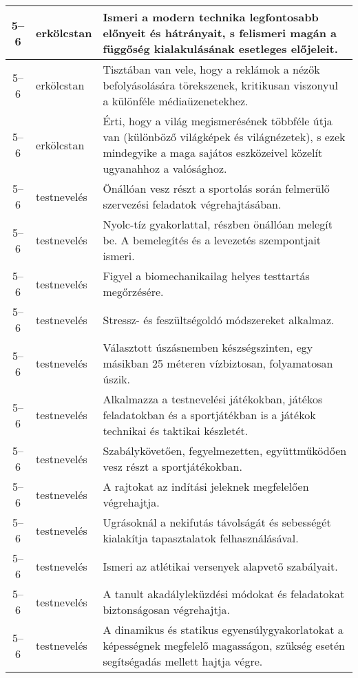 \begin{small}
\begin{longtable}{c | p{2cm} |  p{11cm} }
              5--6 & erkölcstan & Ismeri a modern technika legfontosabb előnyeit és hátrányait, s felismeri magán a függőség kialakulásának esetleges előjeleit. \\ \hline
              5--6 & erkölcstan & Tisztában van vele, hogy a reklámok a nézők befolyásolására törekszenek, kritikusan viszonyul a különféle médiaüzenetekhez. \\ \hline
              5--6 & erkölcstan & Érti, hogy a világ megismerésének többféle útja van (különböző világképek és világnézetek), s ezek mindegyike a maga sajátos eszközeivel közelít ugyanahhoz a valósághoz. \\ \hline
              5--6 & testnevelés & Önállóan vesz részt a sportolás során felmerülő szervezési feladatok végrehajtásában. \\ \hline
              5--6 & testnevelés & Nyolc-tíz gyakorlattal, részben önállóan melegít be. A bemelegítés és a levezetés szempontjait ismeri. \\ \hline
              5--6 & testnevelés & Figyel a biomechanikailag helyes testtartás megőrzésére. \\ \hline
              5--6 & testnevelés & Stressz- és feszültségoldó módszereket alkalmaz. \\ \hline
              5--6 & testnevelés & Választott úszásnemben készségszinten, egy másikban 25 méteren vízbiztosan, folyamatosan úszik. \\ \hline
              5--6 & testnevelés & Alkalmazza a testnevelési játékokban, játékos feladatokban és a sportjátékban is a játékok technikai és taktikai készletét. \\ \hline
              5--6 & testnevelés & Szabálykövetően, fegyelmezetten, együttműködően vesz részt a sportjátékokban. \\ \hline
              5--6 & testnevelés & A rajtokat az indítási jeleknek megfelelően végrehajtja. \\ \hline
              5--6 & testnevelés & Ugrásoknál a nekifutás távolságát és sebességét kialakítja tapasztalatok felhasználásával. \\ \hline
              5--6 & testnevelés & Ismeri az atlétikai versenyek alapvető szabályait. \\ \hline
              5--6 & testnevelés & A tanult akadályleküzdési módokat és feladatokat biztonságosan végrehajtja. \\ \hline
              5--6 & testnevelés & A dinamikus és statikus egyensúlygyakorlatokat a képességnek megfelelő magasságon, szükség esetén segítségadás mellett hajtja végre. \\ \hline

\end{longtable}
\end{small}
